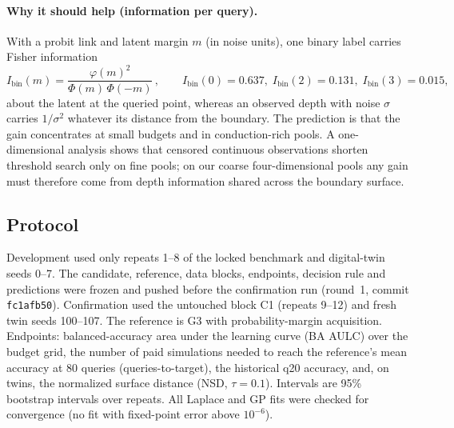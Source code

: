 \paragraph{Why it should help (information per query).} With a probit link and latent margin $m$ (in noise units),
one binary label carries Fisher information
\begin{equation}
  I_{\mathrm{bin}}(m)=\frac{\varphi(m)^2}{\Phi(m)\,\Phi(-m)}\,,\qquad I_{\mathrm{bin}}(0)=0.637,\; I_{\mathrm{bin}}(2)=0.131,\; I_{\mathrm{bin}}(3)=0.015,
\end{equation}
about the latent at the queried point, whereas an observed depth with noise $\sigma$ carries $1/\sigma^2$ whatever its
distance from the boundary. The prediction is that the gain concentrates at small budgets and in conduction-rich
pools. A one-dimensional analysis shows that censored continuous observations shorten threshold search only on fine
pools; on our coarse four-dimensional pools any gain must therefore come from depth information shared across the
boundary surface.

\subsection{Protocol}
Development used only repeats 1--8 of the locked benchmark and digital-twin seeds 0--7. The candidate, reference,
data blocks, endpoints, decision rule and predictions were frozen and pushed before the confirmation run (round~1,
commit \texttt{fc1afb50}). Confirmation used the untouched block C1 (repeats 9--12) and fresh twin seeds 100--107.
The reference is G3 with probability-margin acquisition. Endpoints: balanced-accuracy area under the learning curve
(BA AULC) over the budget grid, the number of paid simulations needed to reach the reference's mean accuracy at 80
queries (queries-to-target), the historical q20 accuracy, and, on twins, the normalized surface distance (NSD, $\tau=0.1$).
Intervals are 95\% bootstrap intervals over repeats. All Laplace and GP fits were checked for convergence (no fit with
fixed-point error above $10^{-6}$).

